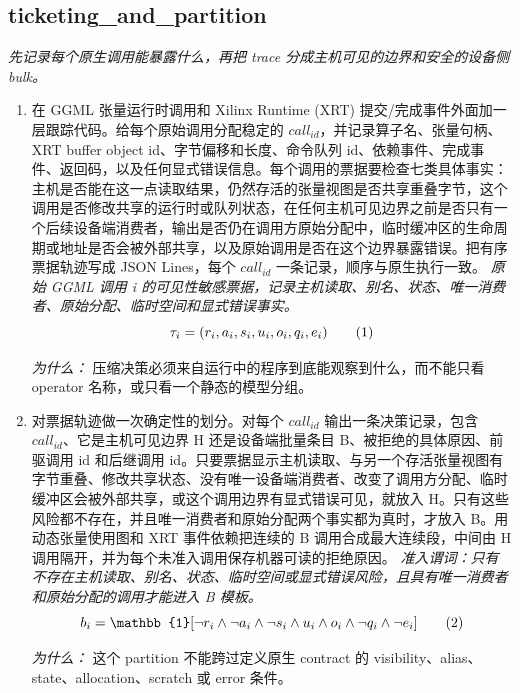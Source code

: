 \documentclass[10pt,a4paper]{article}
\begin{document}
\subsection*{ticketing\_and\_partition}
\emph{先记录每个原生调用能暴露什么，再把 trace 分成主机可见的边界和安全的设备侧 bulk。}
\begin{enumerate}[leftmargin=*,start=1]
  \item 在 GGML 张量运行时调用和 Xilinx Runtime (XRT) 提交/完成事件外面加一层跟踪代码。给每个原始调用分配稳定的 \(call_{id}\)，并记录算子名、张量句柄、XRT buffer object id、字节偏移和长度、命令队列 id、依赖事件、完成事件、返回码，以及任何显式错误信息。每个调用的票据要检查七类具体事实：主机是否能在这一点读取结果，仍然存活的张量视图是否共享重叠字节，这个调用是否修改共享的运行时或队列状态，在任何主机可见边界之前是否只有一个后续设备端消费者，输出是否仍在调用方原始分配中，临时缓冲区的生命周期或地址是否会被外部共享，以及原始调用是否在这个边界暴露错误。把有序票据轨迹写成 JSON Lines，每个 \(call_{id}\) 一条记录，顺序与原生执行一致。
\noindent\emph{原始 GGML 调用 i 的可见性敏感票据，记录主机读取、别名、状态、唯一消费者、原始分配、临时空间和显式错误事实。}
\begin{equation}
\resizebox{\ifdim\width>\linewidth \linewidth\else\width\fi}{!}{$\displaystyle \tau_i = (r_i,a_i,s_i,u_i,o_i,q_i,e_i)$} \tag{1}
\end{equation}
\par\emph{为什么：} 压缩决策必须来自运行中的程序到底能观察到什么，而不能只看 operator 名称，或只看一个静态的模型分组。
  \item 对票据轨迹做一次确定性的划分。对每个 \(call_{id}\) 输出一条决策记录，包含 \(call_{id}\)、它是主机可见边界 H 还是设备端批量条目 B、被拒绝的具体原因、前驱调用 id 和后继调用 id。只要票据显示主机读取、与另一个存活张量视图有字节重叠、修改共享状态、没有唯一设备端消费者、改变了调用方分配、临时缓冲区会被外部共享，或这个调用边界有显式错误可见，就放入 H。只有这些风险都不存在，并且唯一消费者和原始分配两个事实都为真时，才放入 B。用动态张量使用图和 XRT 事件依赖把连续的 B 调用合成最大连续段，中间由 H 调用隔开，并为每个未准入调用保存机器可读的拒绝原因。
\noindent\emph{准入谓词：只有不存在主机读取、别名、状态、临时空间或显式错误风险，且具有唯一消费者和原始分配的调用才能进入 B 模板。}
\begin{equation}
\resizebox{\ifdim\width>\linewidth \linewidth\else\width\fi}{!}{$\displaystyle b_i = \mathbb{1}[\neg r_i \land \neg a_i \land \neg s_i \land u_i \land o_i \land \neg q_i \land \neg e_i]$} \tag{2}
\end{equation}
\par\emph{为什么：} 这个 partition 不能跨过定义原生 contract 的 visibility、alias、state、allocation、scratch 或 error 条件。
\end{enumerate}
\end{document}
